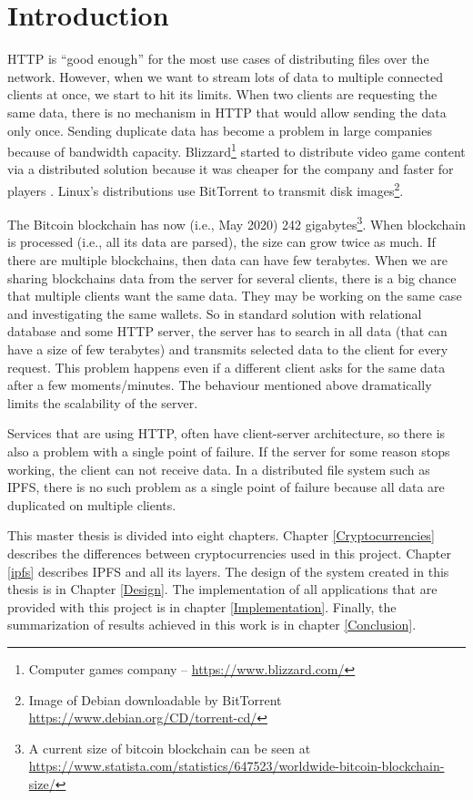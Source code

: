 \chapter{Introduction}


HTTP is ``good enough'' for the most use cases of distributing files over the network. However, when we want to stream lots of data to multiple connected clients at once, we start to hit its limits. When two clients are requesting the same data, there is no mechanism in HTTP that would allow sending the data only once. Sending duplicate data has become a problem in large companies because of bandwidth capacity. Blizzard\footnote{Computer games company -- \url{https://www.blizzard.com/}} started to distribute video game content via a distributed solution because it was cheaper for the company and faster for players \cite{BigDataInVideoGames}. Linux's distributions use BitTorrent to transmit disk images\footnote{Image of Debian downloadable by BitTorrent \url{https://www.debian.org/CD/torrent-cd/}}.

The Bitcoin blockchain has now (i.e., May 2020) 242 gigabytes\footnote{A current size of bitcoin blockchain can be seen at \url{https://www.statista.com/statistics/647523/worldwide-bitcoin-blockchain-size/}}. When blockchain is processed (i.e., all its data are parsed), the size can grow twice as much. If there are multiple blockchains, then data can have few terabytes. When we are sharing blockchains data from the server for several clients, there is a big chance that multiple clients want the same data. They may be working on the same case and investigating the same wallets. So in standard solution with relational database and some HTTP server, the server has to search in all data (that can have a size of few terabytes) and transmits selected data to the client for every request. This problem happens even if a different client asks for the same data after a few moments/minutes. The behaviour mentioned above dramatically limits the scalability of the server.

Services that are using HTTP, often have client-server architecture, so there is also a problem with a single point of failure. If the server for some reason stops working, the client can not receive data. In a distributed file system such as IPFS, there is no such problem as a single point of failure because all data are duplicated on multiple clients.

This master thesis is divided into eight chapters. Chapter \ref{Cryptocurrencies} describes the differences between cryptocurrencies used in this project. Chapter \ref{ipfs} describes IPFS and all its layers. The design of the system created in this thesis is in Chapter \ref{Design}. The implementation of all applications that are provided with this project is in chapter \ref{Implementation}. Finally, the summarization of results achieved in this work is in chapter \ref{Conclusion}.
